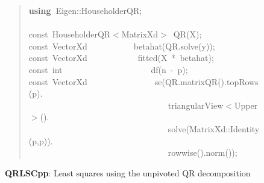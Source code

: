 \documentclass[shortnames,article]{jss}
\newcommand{\hlstd}[1]{\textcolor[rgb]{0,0,0}{#1}}
\newcommand{\hlopt}[1]{\textcolor[rgb]{0,0,0}{#1}}
\newcommand{\hlkwa}[1]{\textcolor[rgb]{0.61,0.13,0.93}{\bf{#1}}}
\newcommand{\hlkwb}[1]{\textcolor[rgb]{0.13,0.54,0.13}{#1}}
\newcommand{\hlkwd}[1]{\textcolor[rgb]{0,0,0}{#1}}
\begin{document}
\begin{figure}[htb]
  \begin{quote}
    \noindent
    \ttfamily
    \hlstd{}\hlkwa{using\ }\hlstd{Eigen}\hlopt{::}\hlstd{HouseholderQR}\hlopt{;}\hspace*{\fill}\\
    \hlstd{}\hspace*{\fill}\\
    \hlkwb{const\ }\hlstd{HouseholderQR}\hlopt{$<$}\hlstd{MatrixXd}\hlopt{$>$\ }\hlstd{}\hlkwd{QR}\hlstd{}\hlopt{(}\hlstd{X}\hlopt{);}\hspace*{\fill}\\
    \hlstd{}\hlkwb{const\ }\hlstd{VectorXd}\hlstd{\ \ \ \ \ \ \ \ \ \ \ }\hlstd{}\hlkwd{betahat}\hlstd{}\hlopt{(}\hlstd{QR}\hlopt{.}\hlstd{}\hlkwd{solve}\hlstd{}\hlopt{(}\hlstd{y}\hlopt{));}\hspace*{\fill}\\
    \hlstd{}\hlkwb{const\ }\hlstd{VectorXd}\hlstd{\ \ \ \ \ \ \ \ \ \ \ \ }\hlstd{}\hlkwd{fitted}\hlstd{}\hlopt{(}\hlstd{X\ }\hlopt{{*}\ }\hlstd{betahat}\hlopt{);}\hspace*{\fill}\\
    \hlstd{}\hlkwb{const\ int}\hlstd{\ \ \ \ \ \ \ \ \ \ \ \ \ \ \ \ \ \ \ \ \ }\hlkwb{}\hlstd{}\hlkwd{df}\hlstd{}\hlopt{(}\hlstd{n\ }\hlopt{{-}\ }\hlstd{p}\hlopt{);}\hspace*{\fill}\\
    \hlstd{}\hlkwb{const\ }\hlstd{VectorXd}\hlstd{\ \ \ \ \ \ \ \ \ \ \ \ \ \ \ \ }\hlstd{}\hlkwd{se}\hlstd{}\hlopt{(}\hlstd{QR}\hlopt{.}\hlstd{}\hlkwd{matrixQR}\hlstd{}\hlopt{().}\hlstd{}\hlkwd{topRows}\hlstd{}\hlopt{(}\hlstd{p}\hlopt{).}\hspace*{\fill}\\
    \hlstd{}\hlstd{\ \ \ \ \ \ \ \ \ \ \ \ \ \ \ \ \ \ \ \ \ \ \ \ \ \ \ \ \ \ \ \ \ }\hlstd{triangularView}\hlopt{$<$}\hlstd{Upper}\hlopt{$>$().}\hspace*{\fill}\\
    \hlstd{}\hlstd{\ \ \ \ \ \ \ \ \ \ \ \ \ \ \ \ \ \ \ \ \ \ \ \ \ \ \ \ \ \ \ \ \ }\hlstd{}\hlkwd{solve}\hlstd{}\hlopt{(}\hlstd{MatrixXd}\hlopt{::}\hlstd{}\hlkwd{Identity}\hlstd{}\hlopt{(}\hlstd{p}\hlopt{,}\hlstd{p}\hlopt{)).}\hspace*{\fill}\\
    \hlstd{}\hlstd{\ \ \ \ \ \ \ \ \ \ \ \ \ \ \ \ \ \ \ \ \ \ \ \ \ \ \ \ \ \ \ \ \ }\hlstd{}\hlkwd{rowwise}\hlstd{}\hlopt{().}\hlstd{}\hlkwd{norm}\hlstd{}\hlopt{());}\hlstd{}\hspace*{\fill}
    \normalfont
    \normalsize
    \caption{\textbf{QRLSCpp}: Least squares using the unpivoted QR decomposition}
    \label{QRLS}
  \end{quote}
\end{figure}
\end{document}
